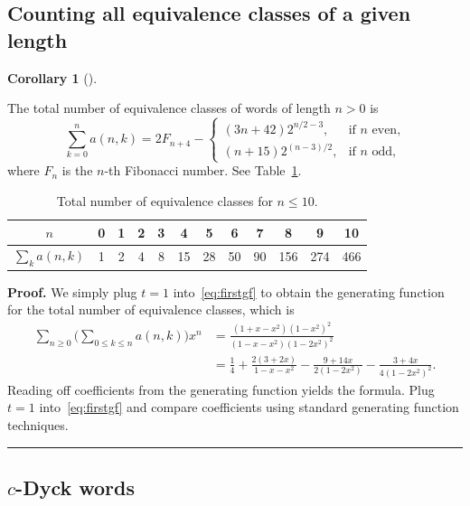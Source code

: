 \documentclass[numbers=enddot,12pt,final,onecolumn,notitlepage]{scrartcl}%
\theoremstyle{definition}
\newtheorem{coro}[theo]{Corollary}
\newenvironment{corollary}[1][]
{\begin{coro}[#1]\begin{leftbar}}
{\end{leftbar}\end{coro}}
\newenvironment{proof}[1][Proof]{\noindent\textbf{#1.} }{\ \rule{0.5em}{0.5em}}
\newenvironment{verlong}{}{}
\newenvironment{vershort}{}{}
\begin{document}
\subsection{Counting all equivalence classes of a given length}

\begin{corollary}\label{cor:total_number}
    The total number of equivalence classes of words of length $n > 0$ is
    \[
	\sum_{k=0}^n a(n,k)
	= 2F_{n+4} - \begin{cases} (3n+42)2^{n/2-3}, & \text{if } n \text{ even,} \\ (n+15)2^{(n-3)/2}, & \text{if } n \text{ odd,} \end{cases}
	\]
    where $F_n$ is the $n$-th Fibonacci number. See Table~\ref{tab:a_tot}.
\end{corollary}

\begin{table}[ht]
\centering
\begin{tabular}{ |c|ccccccccccc|} 
 \hline
$n$ & 0 & 1 & 2 & 3 & 4 & 5 & 6 & 7 & 8 & 9 & 10 \\ 
\hline
$\sum_k a(n,k)$ & 1 & 2 & 4 & 8 & 15 & 28 & 50 & 90 & 156 & 274 & 466 \\
\hline
\end{tabular}
\caption{Total number of equivalence classes for $n \leq 10$.}\label{tab:a_tot}
\end{table}

\begin{proof}
\begin{verlong}
We simply plug $t=1$ into~\eqref{eq:firstgf} to obtain the generating function for the total number of equivalence classes, which is
\begin{align*}
\sum_{n \geq 0} \Big( \sum_{0 \leq k \leq n} a(n,k) \Big) x^n &= \frac{(1+x-x^2)(1-x^2)^2}{(1-x-x^2)(1-2x^2)^2} \\
&= \frac14 + \frac{2 (3 + 2 x)}{1-x-x^2} - \frac{9+14x}{2(1-2x^2)} - \frac{3+4x}{4(1-2x^2)^2}.
\end{align*}
Reading off coefficients from the generating function yields the formula.
\end{verlong}
\begin{vershort}
Plug $t = 1$ into~\eqref{eq:firstgf} and compare coefficients using standard generating function techniques.
\end{vershort}
\end{proof}

\subsection{$c$-Dyck words}
\end{document}
